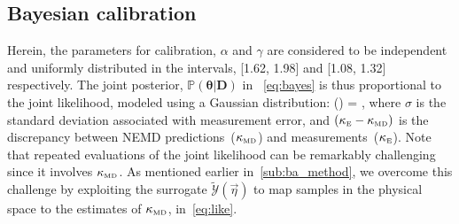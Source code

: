 \subsection{Bayesian calibration}
\label{sub:ba}

Herein, the parameters for calibration, $\alpha$ and $\gamma$ are considered to be independent and
uniformly distributed in the intervals, [1.62, 1.98] and [1.08, 1.32] respectively. The joint posterior,
$\mathbb{P}(\bm{\theta}\vert \bm{D})$ in ~\eqref{eq:bayes} is thus 
proportional to the joint likelihood, modeled using a Gaussian distribution:
%
\be
{}(\vert\bm{\theta}) = \exp{},
\label{eq:like}
\ee
%
\noindent where $\sigma$ is the standard deviation associated with measurement error, and
$(\kappa_{\tiny{\mbox{E}}} - \kappa_{\tiny{\mbox{MD}}})$ is the discrepancy between 
NEMD predictions~($\kappa_{\tiny{\mbox{MD}}}$) and measurements~($\kappa_{\tiny{\mbox{E}}}$). 
Note that repeated evaluations of the joint likelihood can be remarkably challenging since it involves 
$\kappa_{\tiny{\mbox{MD}}}$. As mentioned earlier in~\ref{sub:ba_method}, we overcome this challenge by
exploiting the surrogate
$\tilde{\mathcal{Y}}(\vec{\eta})$ to map samples in the physical space to the estimates of 
$\kappa_{\tiny{\mbox{MD}}}$, in~\eqref{eq:like}.

